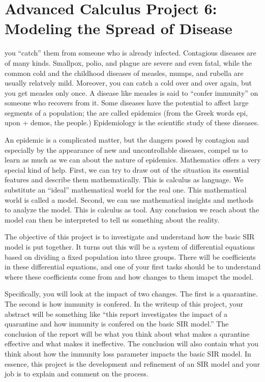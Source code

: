 \documentclass
[justified,nohyper]
{tufte-handout}
\begin{document}
\section{Advanced Calculus Project 6: Modeling the Spread of Disease}

 you ``catch'' them from someone who is already infected. Contagious diseases are of many kinds. Smallpox, polio, and plague are severe and even fatal, while the common cold and the childhood diseases of measles, mumps, and rubella are usually relatvely mild. Moreover, you can catch a cold over and over again, but you get measles only once. A disease like measles is said to ``confer immunity'' on someone who recovers from it. Some diseases have the potential to affect large segments of a population; the are called epidemics (from the Greek words epi, upon + demos, the people.) Epidemiology is the scientific study of these diseases.

An epidemic is a complicated matter, but the dangers posed by contagion and especially by the appearance of new and uncontrollable diseases, compel us to learn as much as we can about the nature of epidemics. Mathematics offers a very special kind of help. First, we can try to draw out of the situation its essential features and describe them mathematically. This is calculus as language. We substitute an ``ideal'' mathematical world for the real one. This mathematical world is called a model. Second, we can use mathematical insights and methods to analyze the model. This is calculus as tool. Any conclusion we reach about the model can then be interpreted to tell us something about the reality.

The objective of this project is to investigate and understand how the basic SIR model is put together. It turns out this will be a system of differential equations based on dividing a fixed population into three groups. There will be coefficients in these differential equations, and one of your first tasks should be to understand where these coefficients come from and how changes to them imapct the model.

Specifically, you will look at the impact of two changes. The first is a quarantine. The second is how immunity is confered. In the writeup of this project, your abstract will be something like ``this report investigates the impact of a quarantine and how immunity is confered on the basic SIR model.'' The conclusion of the report will be what you think about what makes a qurantine effective and what makes it ineffective. The conclusion will also contain what you think about how the immunity loss parameter impacts the basic SIR model. In essence, this project is the development and refinement of an SIR model and your job is to explain and comment on the process.
\end{document}
